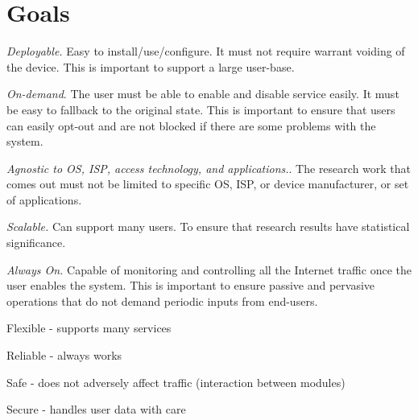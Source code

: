 \section{Goals}

\begin{packedenumerate}
\item \emph{Deployable.} 
Easy to install/use/configure. 
It must not require warrant voiding of the device. 
This is important to support a large user-base. 
\item \emph{On-demand}.
The user must be able to enable and disable service easily.
It must be easy to fallback to the original state.
This is important to ensure that users can easily opt-out and are not blocked if there are some problems with the system. 
\item \emph{Agnostic to OS, ISP, access technology, and applications.}.
The research work that comes out must not be limited to specific OS, ISP, or device manufacturer, or set of applications.
\item \emph{Scalable.} 
Can support many users. 
To ensure that research results have statistical significance. 
\item \emph{Always On.} 
Capable of monitoring and controlling all the Internet traffic once the user enables the system.
This is important to ensure passive and pervasive operations that do not demand periodic inputs from end-users.
\item Flexible - supports many services
\item Reliable - always works
\item Safe - does not adversely affect traffic (interaction between modules)
\item Secure - handles user data with care
\end{packedenumerate}



